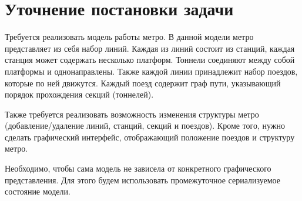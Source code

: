 \section{Уточнение постановки задачи}

Требуется реализовать модель работы метро.
В данной модели метро представляет из себя набор линий.
Каждая из линий состоит из станций, каждая станция может содержать несколько платформ.
Тоннели соединяют между собой платформы и однонаправлены.
Также каждой линии принадлежит набор поездов, которые по ней движутся.
Каждый поезд содержит граф пути, указывающий порядок прохождения секций (тоннелей).

Также требуется реализовать возможность изменения структуры метро (добавление/удаление линий, станций, секций и поездов).
Кроме того, нужно сделать графический интерфейс, отображающий положение поездов и структуру метро.

Необходимо, чтобы сама модель не зависела от конкретного графического представления.
Для этого будем использовать промежуточное сериализуемое состояние модели.
